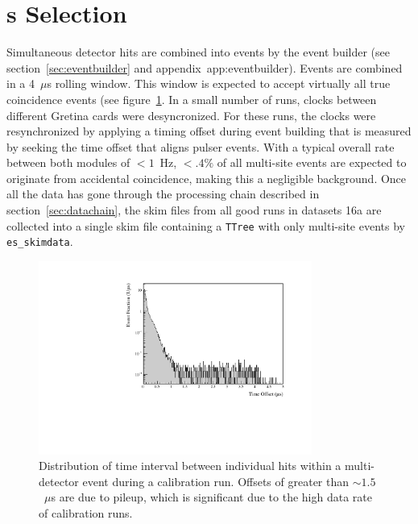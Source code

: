 \documentclass[/main.tex]{subfiles}
\begin{document}
\section{\Md s Selection}
Simultaneous detector hits are combined into events by the event builder (see section~\ref{sec:eventbuilder} and appendix~{app:eventbuilder}).
Events are combined in a 4~$\mu$s rolling window.
This window is expected to accept virtually all true coincidence events (see figure~\ref{fig:toffset}.
In a small number of runs, clocks between different Gretina cards were desyncronized.
For these runs, the clocks were resynchronized by applying a timing offset during event building that is measured by seeking the time offset that aligns pulser events.
With a typical overall rate between both modules of $<1$~Hz, $<.4\%$ of all multi-site events are expected to originate from accidental coincidence, making this a negligible background.
Once all the data has gone through the processing chain described in section~\ref{sec:datachain}, the skim files from all good runs in datasets 1\-6a are collected into a single skim file containing a \texttt{TTree} with only multi-site events by \texttt{es\_skimdata}.
\\
\begin{figure}[ht]
  \centering
  \includegraphics[width=0.8\textwidth]{toffset}
  \caption[Distribution of offset times within multi-detector events]{\label{fig:toffset}
    Distribution of time interval between individual hits within a multi-detector event during a  calibration run. Offsets of greater than $\sim1.5$~$\mu$s are due to pileup, which is significant due to the high data rate of calibration runs.}
\end{figure}
\end{document}
